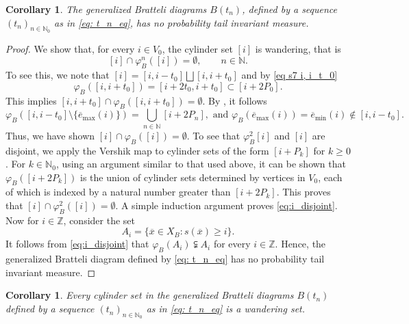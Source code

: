 \documentclass[11pt,reqno]{amsart}
\theoremstyle{definition}
\theoremstyle{remark}
\theoremstyle{plain}
\newtheorem{corol}[definition]{Corollary}
\def\ol{\overline}
\newcommand{\N}{\mathbb N}
\newcommand{\Z}{\mathbb Z}
\numberwithin{equation}{section}
\begin{document}
\begin{corol} \label{s8 cor1}
The generalized Bratteli diagrams $B(t_n)$, defined by a sequence $(t_n)_{n\in\N_0}$ as in \eqref{eq: t_n_eq}, has no probability tail invariant measure. 
\end{corol}

\begin{proof} We show that, for every $i \in V_0$, the cylinder set 
$[i]$ is wandering, that is
\begin{equation}\label{eq:i_disjoint}
    [i] \cap \varphi_B^n([i]) = \emptyset, \qquad n \in \N.
\end{equation}
To see this, we note that $[i] = [i,i-t_0] \bigsqcup [i,i+t_0]$ and
by \eqref{eq s7 i, i_t_0}
\begin{equation}\label{eq:i+t_wander}
    \varphi_{B}([i,i+t_0])  = [i+2t_0, i+t_0] \subset [i+2P_0].
\end{equation}  This implies $[i,i+t_0] \cap \varphi_{B}([i,i+t_0]) = \emptyset$. By , it follows
\begin{equation}\label{eq:i-t_wander}
    \varphi_B([i,i-t_0]\setminus \{\ol{e}_{\mathrm{max}} (i)\}) = \bigcup_{n\in \N} [i+2P_n],\,\,\mathrm{and}\,\, \varphi_B(\ol{e}_{\mathrm{max}} (i)) = \ol{e}_{\mathrm{min}} (i) \notin [i,i-t_0]. 
\end{equation}
Thus, we have shown $[i] \cap \varphi_B([i]) = \emptyset$. To see that $\varphi^2_B[i]$ and $[i]$ are disjoint, we apply the Vershik map to cylinder sets of the form $[i+P_k]$ for $k\geq 0$. For $k\in\N_0$, using an argument similar to that used above, it can be shown that $\varphi_B([i+2P_k])$ is the union of cylinder sets determined by vertices in $V_0$, each of which is indexed by a natural number greater than $[i+2P_k]$. This proves that $[i] \cap \varphi^2_B([i]) = \emptyset$. A simple induction argument proves \eqref{eq:i_disjoint}. Now for $i \in \Z$, consider the set
\[
A_i = \{\overline{x} \in X_B : s(\overline{x}) \geq i\}.
\]
It follows from \eqref{eq:i_disjoint} that $\varphi_B (A_i) \subsetneqq A_i$ for every $i \in \Z$. Hence, the generalized Bratteli diagram defined by \eqref{eq: t_n_eq} has no probability tail invariant measure.
\end{proof}

\begin{corol} Every cylinder set in the generalized Bratteli diagrams $B(t_n)$ defined by a sequence $(t_n)_{n\in\N_0}$ as in \eqref{eq: t_n_eq} is a wandering set.
    
\end{corol} 
\end{document}
